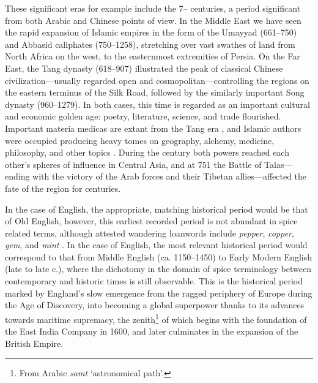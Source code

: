 These significant eras for example include the 7-- centuries, a period significant from both Arabic and Chinese points of view. In the Middle East we have seen the rapid expansion of Islamic empires in the form of the Umayyad (661--750) and Abbasid caliphates (750--1258), stretching over vast swathes of land from North Africa on the west, to the easternmost extremities of Persia. On the Far East, the Tang dynasty (618--907) illustrated the peak of classical Chinese civilization---usually regarded open and cosmopolitan---controlling the regions on the eastern terminus of the Silk Road, followed by the similarly important Song dynasty (960--1279). In both cases, this time is regarded as an important cultural and economic golden age: poetry, literature, science, and trade flourished. Important \glspl{materia medica} are extant from the Tang era \autocite{wu_illustrated_2005}, and Islamic authors were occupied producing heavy tomes on geography, alchemy, medicine, philosophy, and other topics \autocite[131]{meri_medieval_2006}. During the  century both powers reached each other's spheres of influence in Central Asia, and at 751 the Battle of Talas---ending with the victory of the Arab forces and their Tibetan allies---affected the fate of the region for centuries. 

In the case of English, the appropriate, matching historical period would be that of Old English, however, this earliest recorded period is not abundant in spice related terms, although attested wandering loanwords include \textit{pepper}, \textit{copper}, \textit{gem}, and \textit{mint} \autocite{wollman_early_1993}. In the case of English, the most relevant historical period would correspond to that from Middle English (ca. 1150--1450) to Early Modern English (late  to late  c.), where the dichotomy in the domain of spice terminology between contemporary and historic times is still observable. This is the historical period marked by England's slow emergence from the ragged periphery of Europe during the Age of Discovery, into becoming a global superpower thanks to its advances towards maritime supremacy, the zenith\footnote{From Arabic \textit{samt} `astronomical path'.} of which begins with the foundation of the East India Company in 1600, and later culminates in the expansion of the British Empire.



